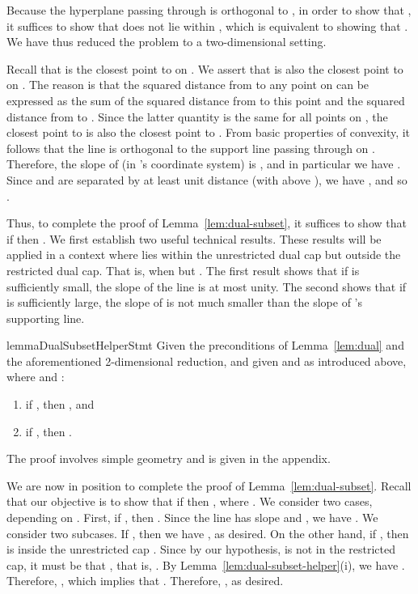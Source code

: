 \documentclass[11pt]{article}   \usepackage[letterpaper,hmargin=2.1cm,vmargin=3cm]{geometry}
\begin{document}
Because the hyperplane passing through  is orthogonal to , in order to show that , it suffices to show that  does not lie within , which is equivalent to showing that . We have thus reduced the problem to a two-dimensional setting.

Recall that  is the closest point to  on . We assert that  is also the closest point to  on . The reason is that the squared distance from  to any point on  can be expressed as the sum of the squared distance from  to this point and the squared distance from  to . Since the latter quantity is the same for all points on , the closest point to  is also the closest point to . From basic properties of convexity, it follows that the line  is orthogonal to the support line passing through  on . Therefore, the slope of  (in 's coordinate system) is , and in particular we have . Since  and  are separated by at least unit distance (with  above ), we have , and so . 

Thus, to complete the proof of Lemma~\ref{lem:dual-subset}, it suffices to show that if  then . We first establish two useful technical results. These results will be applied in a context where  lies within the unrestricted dual cap but outside the restricted dual cap. That is, when  but . The first result shows that if  is sufficiently small, the slope of the line  is at most unity. The second shows that if  is sufficiently large, the slope of  is not much smaller than the slope of 's supporting line.

\begin{restatable}{lemma}{DualSubsetHelperStmt}\label{lem:dual-subset-helper}
Given the preconditions of Lemma~\ref{lem:dual} and the aforementioned 2-dimensional reduction, and given  and  as introduced above, where  and :
\begin{enumerate}
\item[] if , then , and

\item[] if , then .
\end{enumerate}
\end{restatable}


The proof involves simple geometry and is given in the appendix.

\medskip

We are now in position to complete the proof of Lemma~\ref{lem:dual-subset}. Recall that our objective is to show that if  then , where . We consider two cases, depending on . First, if , then . Since the line  has slope  and , we have . We consider two subcases. If , then we have , as desired. On the other hand, if , then  is inside the unrestricted cap . Since by our hypothesis,  is not in the restricted cap, it must be that , that is, . By Lemma~\ref{lem:dual-subset-helper}(i), we have . Therefore, , which implies that . Therefore, , as desired.
\end{document}
